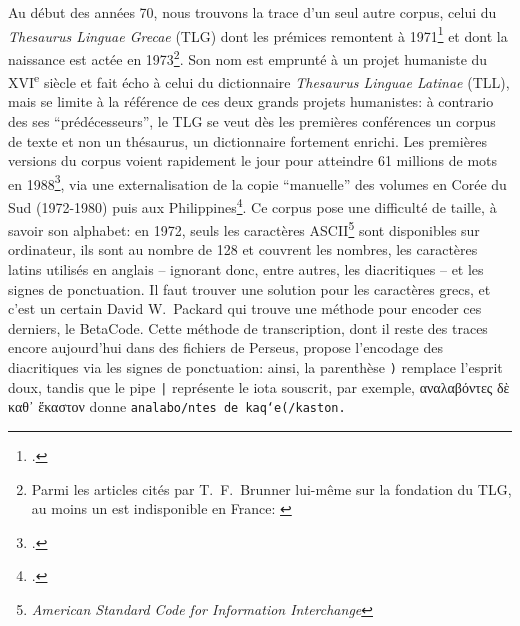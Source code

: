 Au début des années 70, nous trouvons la trace d'un seul autre corpus, celui du \textit{Thesaurus Linguae Grecae} (TLG) dont les prémices remontent à 1971\footcite{brunner_classics_1993} et dont la naissance est actée en 1973\footnote{Parmi les articles cités par T.~F.~Brunner lui-même sur la fondation du TLG, au moins un est indisponible en France: \cite{hugues_homer_1987}}. Son nom est emprunté à un projet humaniste du XVI\textsuperscript{e} siècle et fait écho à celui du dictionnaire \textit{Thesaurus Linguae Latinae} (TLL), mais se limite à la référence de ces deux grands projets humanistes: à contrario des ses \enquote{prédécesseurs}, le TLG se veut dès les premières conférences un corpus de texte et non un thésaurus, un dictionnaire fortement enrichi. Les premières versions du corpus voient rapidement le jour pour atteindre 61 millions de mots en 1988\footcite{brunner_overcoming_1988}, via une externalisation de la copie \enquote{manuelle} des volumes en Corée du Sud (1972-1980) puis aux Philippines\footcite[p. 111]{helgerson_cd-rom_1988}. Ce corpus pose une difficulté de taille, à savoir son alphabet: en 1972, seuls les caractères ASCII\footnote{\textit{American Standard Code for Information Interchange}} sont disponibles sur ordinateur, ils sont au nombre de 128 et couvrent les nombres, les caractères latins utilisés en anglais -- ignorant donc, entre autres, les diacritiques -- et les signes de ponctuation. Il faut trouver une solution pour les caractères grecs, et c'est un certain David W.~Packard qui trouve une méthode pour encoder ces derniers, le BetaCode. Cette méthode de transcription, dont il reste des traces encore aujourd'hui dans des fichiers de Perseus, propose l'encodage des diacritiques via les signes de ponctuation: ainsi, la parenthèse \texttt{)} remplace l'esprit doux, tandis que le pipe \texttt{|} représente le iota souscrit, par exemple, αναλαβόντες δὲ καθ᾽ ἕκαστον donne \texttt{analabo/ntes de\ kaq`e(/kaston.}


